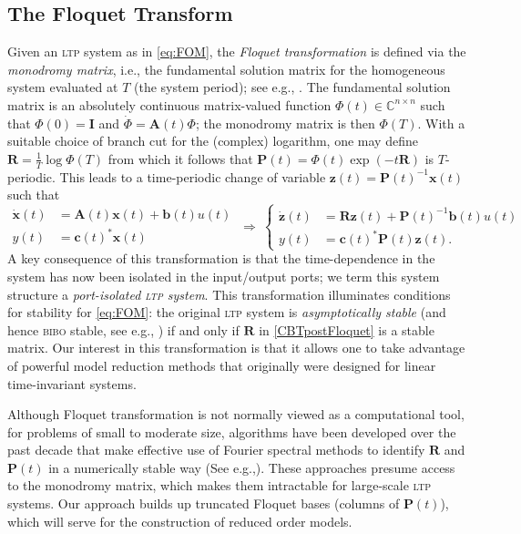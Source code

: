 \documentclass[pdflatex,sn-mathphys-num]{sn-jnl}%
\theoremstyle{thmstyleone}%
\theoremstyle{thmstyletwo}%
\theoremstyle{thmstylethree}%
\begin{document}
\subsection{The Floquet Transform}
\label{subsec:FloqTrans}
Given an \textsc{ltp}  system as in \eqref{eq:FOM}, the \emph{Floquet transformation} is defined via the \emph{monodromy matrix}, i.e., the fundamental solution matrix for the homogeneous system evaluated at $T$ (the system period); see e.g., \cite{chiconeODE}. The fundamental solution matrix is an absolutely continuous matrix-valued function $\Phi(t)\in\mathbb{C}^{n\times n}$ such that $\Phi(0)=\mathbf{I}$ and 
$\dot{\Phi} = \mathbf{A}(t) \Phi$; the monodromy matrix is then $\Phi(T)$. With a suitable choice of branch cut for the (complex) logarithm, one may define $\mathbf{R}=\frac{1}{T}\log \Phi(T)$ from which it follows that  $\mathbf{P}(t)= \Phi(t)\exp(-t\mathbf{R})$ 
is $T$-periodic. This leads to 
a time-periodic change of variable $\mathbf{z}(t) = \mathbf{P}(t)^{-1} \mathbf{x}(t)$ such that 
\begin{equation} \label{CBTpostFloquet}
	\begin{aligned}
			 \dot{\mathbf{x}}(t) &= \mathbf{A}(t) \mathbf{x}(t) + \mathbf{b}(t) {u}(t)\\
		{y}(t) &= \mathbf{c}(t)^* \mathbf{x}(t)
	\end{aligned} ~ \Longrightarrow ~
	\left\{\begin{aligned}
		\dot{\mathbf{z}}(t) &= \mathbf{R} \mathbf{z}(t) + \mathbf{P}(t)^{-1}\mathbf{b}(t) {u}(t)\\
		{y}(t) &= \mathbf{c}(t)^* \mathbf{P}(t) \mathbf{z}(t).
	\end{aligned} \right.
          \end{equation}
A key consequence of this transformation is that the time-dependence in the system has now been isolated in the input/output ports; we term this system structure a \emph{port-isolated \textsc{ltp} system}.  This transformation illuminates conditions for stability for \eqref{eq:FOM}: the original \textsc{ltp} system is \emph{asymptotically stable} (and hence \textsc{bibo} stable, see e.g., \cite[\S30]{brockett2015FinDimLinSys}) if and only if $\mathbf{R}$ in \eqref{CBTpostFloquet} is a stable matrix. Our interest in this transformation is that it allows one to take advantage of powerful model reduction methods that originally were designed for linear time-invariant systems.

Although Floquet transformation is not normally viewed as a computational tool, for problems of small to moderate size, algorithms have been developed over the past decade that make effective use of Fourier spectral methods to identify $\mathbf{R}$ and $\mathbf{P}(t)$ in a numerically stable way (See e.g.,\cite{deconinckComputingSpectraLinear2006,mooreFloquetTheoryComputational2005}).  
These approaches presume access to the monodromy matrix, which makes them intractable for large-scale \textsc{ltp}  systems.  
Our approach builds up truncated Floquet bases (columns of $\mathbf{P}(t)$), which will serve for the construction of reduced order models.
\end{document}
